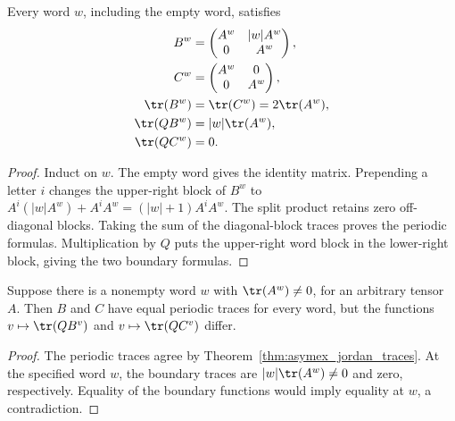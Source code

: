 \begin{theorem}
    \label{thm:asymex_jordan_traces}
    \leanok
    Every word $w$, including the empty word, satisfies
    \begin{align}
        B^w       & =\begin{pmatrix}A^w&|w|A^w\\0&A^w\end{pmatrix}, \\
        C^w       & =\begin{pmatrix}A^w&0\\0&A^w\end{pmatrix},      \\
        \tr(B^w)  & =\tr(C^w)=2\tr(A^w),                            \\
        \tr(QB^w) & =|w|\tr(A^w),                                   \\
        \tr(QC^w) & =0.
    \end{align}
\end{theorem}
\begin{proof}
    \leanok
    Induct on $w$. The empty word gives the identity matrix.
    Prepending a letter $i$ changes the upper-right block of $B^w$
    to $A^i(|w|A^w)+A^iA^w=(|w|+1)A^iA^w$.
    The split product retains zero off-diagonal blocks.
    Taking the sum of the diagonal-block traces proves the periodic
    formulas. Multiplication by $Q$ puts the upper-right word block
    in the lower-right block, giving the two boundary formulas.
\end{proof}

\begin{theorem}
    \label{thm:asymex_jordan_detection}
    \leanok
    Suppose there is a nonempty word $w$ with $\tr(A^w)\neq0$, for an
    arbitrary tensor $A$. Then $B$ and $C$ have equal periodic traces for
    every word, but the functions $v\mapsto\tr(QB^v)$ and
    $v\mapsto\tr(QC^v)$ differ.
\end{theorem}
\begin{proof}
    \leanok
    The periodic traces agree by
    Theorem~\ref{thm:asymex_jordan_traces}.
    At the specified word $w$, the boundary traces are
    $|w|\tr(A^w)\neq0$ and zero, respectively.
    Equality of the boundary functions would imply equality at $w$,
    a contradiction.
\end{proof}
